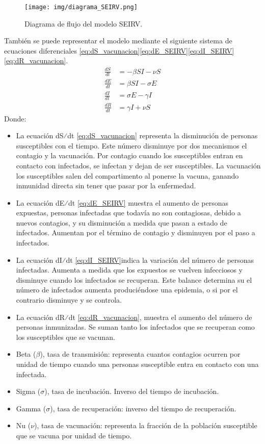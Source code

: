 \begin{figure}[H]
    \centering
    \texttt{[image: img/diagrama\_SEIRV.png]}
    \caption{Diagrama de flujo del modelo SEIRV.}
    \label{fig:eje SEIRV}
    \vspace{0.5cm} %
\end{figure}
También se puede representar el modelo mediante el siguiente sistema de ecuaciones diferenciales \eqref{eq:dS_vacunacion}\eqref{eq:dE_SEIRV}\eqref{eq:dI_SEIRV}\eqref{eq:dR_vacunacion}.
\begin{align}
\frac{dS}{dt} &= -\beta SI - \nu S \label{eq:dS_vacunacion} \\
\frac{dE}{dt} &= \beta SI - \sigma E \label{eq:dE_SEIRV} \\
\frac{dI}{dt} &= \sigma E - \gamma I \label{eq:dI_SEIRV} \\
\frac{dR}{dt} &= \gamma I + \nu S \label{eq:dR_vacunacion}
\end{align}
Donde:
\begin{itemize}
    \item 	La ecuación dS⁄dt \eqref{eq:dS_vacunacion} representa la disminución de personas susceptibles con el tiempo. Este número disminuye por dos mecanismos el contagio y la vacunación. Por contagio cuando los susceptibles entran en contacto con infectados, se infectan y dejan de ser susceptibles. La vacunación los susceptibles salen del compartimento al ponerse la vacuna, ganando inmunidad directa sin tener que pasar por la enfermedad.
    \item 	La ecuación dE⁄dt \eqref{eq:dE_SEIRV} muestra el aumento de personas expuestas, personas infectadas que todavía no son contagiosas, debido a nuevos contagios, y su disminución a medida que pasan a estado de infectados. Aumentan por el término de contagio y disminuyen por el paso a infectados.
    \item 	La ecuación dI⁄dt \eqref{eq:dI_SEIRV}indica la variación del número de personas infectadas. Aumenta a medida que los expuestos se vuelven infecciosos y disminuye cuando los infectados se recuperan. Este balance determina su el número de infectados aumenta produciéndose una epidemia, o si por el contrario disminuye y se controla.
    \item La ecuación dR⁄dt \eqref{eq:dR_vacunacion}, muestra el aumento del número de personas inmunizadas. Se suman tanto los infectados que se recuperan como los susceptibles que se vacunan.
    \item 	Beta ($\beta$), tasa de transmisión: representa cuantos contagios ocurren por unidad de tiempo cuando una personas susceptible entra en contacto con una infectada.
    \item Sigma ($\sigma$), tasa de incubación. Inverso del tiempo de incubación.
    \item Gamma ($\sigma$), tasa de recuperación: inverso del tiempo de recuperación.
    \item 	Nu ($\nu$), tasa de vacunación: representa la fracción de la población susceptible que se vacuna por unidad de tiempo.
\end{itemize}

